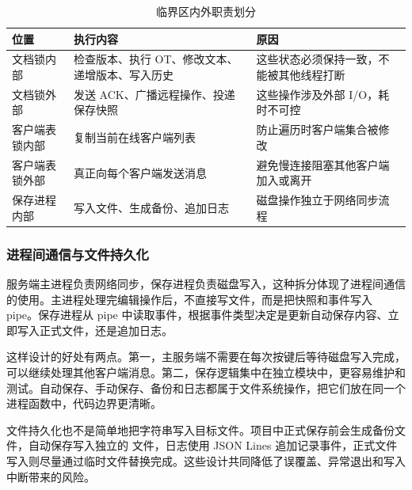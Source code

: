 \begin{table}[H]
    \centering
    \caption{临界区内外职责划分}
    \small
    \begin{tabular}{p{} p{} p{}}
        \toprule
        位置 & 执行内容 & 原因 \\
        \midrule
        文档锁内部 & 检查版本、执行 OT、修改文本、递增版本、写入历史 & 这些状态必须保持一致，不能被其他线程打断 \\
        文档锁外部 & 发送 ACK、广播远程操作、投递保存快照 & 这些操作涉及外部 I/O，耗时不可控 \\
        客户端表锁内部 & 复制当前在线客户端列表 & 防止遍历时客户端集合被修改 \\
        客户端表锁外部 & 真正向每个客户端发送消息 & 避免慢连接阻塞其他客户端加入或离开 \\
        保存进程内部 & 写入文件、生成备份、追加日志 & 磁盘操作独立于网络同步流程 \\
        \bottomrule
    \end{tabular}
\end{table}

\subsubsection{进程间通信与文件持久化}

服务端主进程负责网络同步，保存进程负责磁盘写入，这种拆分体现了进程间通信的使用。主进程处理完编辑操作后，不直接写文件，而是把快照和事件写入 pipe。保存进程从 pipe 中读取事件，根据事件类型决定是更新自动保存内容、立即写入正式文件，还是追加日志。

这样设计的好处有两点。第一，主服务端不需要在每次按键后等待磁盘写入完成，可以继续处理其他客户端消息。第二，保存逻辑集中在独立模块中，更容易维护和测试。自动保存、手动保存、备份和日志都属于文件系统操作，把它们放在同一个进程函数中，代码边界更清晰。

文件持久化也不是简单地把字符串写入目标文件。项目中正式保存前会生成备份文件，自动保存写入独立的  文件，日志使用 JSON Lines 追加记录事件，正式文件写入则尽量通过临时文件替换完成。这些设计共同降低了误覆盖、异常退出和写入中断带来的风险。

